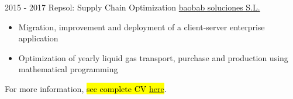\documentclass[letterpaper]{twentysecondcv} %
\begin{document}
\begin{twenty}
  \twentyitem
      {2015 - 2017 }
    {}
        {Repsol: Supply Chain Optimization}
        {\href{https://baobabsoluciones.es/en/}{baobab soluciones S.L.}}
        {}
        {
        {\begin{itemize}
        \item Migration, improvement and deployment of a client-server enterprise application
        \item Optimization of yearly liquid gas transport, purchase and production using mathematical programming
        \vspace{2mm}
        \end{itemize}}
        }
\end{twenty}

For more information, \hl{see complete CV \hbox{\href{https://europa.eu/europass/eportfolio/screen/share/623202bb-9b6a-476f-bcdd-47a9b5bd617d?lang=en}{here}}}.
\end{document}
